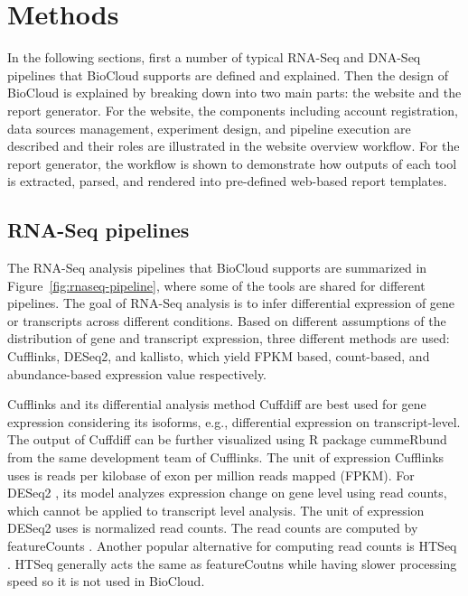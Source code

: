 \chapter{Methods}
\label{c:method}

In the following sections, first a number of typical RNA-Seq and DNA-Seq
pipelines that BioCloud supports are defined and explained. Then the design of
BioCloud is explained by breaking down into two main parts: the website and the
report generator. For the website, the components including account
registration, data sources management, experiment design, and pipeline
execution are described and their roles are illustrated in the website overview
workflow. For the report generator, the workflow is shown to demonstrate how
outputs of each tool is extracted, parsed, and rendered into pre-defined
web-based report templates.



\section{RNA-Seq pipelines}
\label{s:rnaseq-pipeline}

The RNA-Seq analysis pipelines that BioCloud supports are summarized in
Figure~\ref{fig:rnaseq-pipeline}, where some of the tools are shared for
different pipelines. The goal of RNA-Seq analysis is to infer differential
expression of gene or transcripts across different conditions. Based on
different assumptions of the distribution of gene and transcript expression,
three different methods are used: Cufflinks, DESeq2, and kallisto, which yield
FPKM based, count-based, and abundance-based expression value respectively.



Cufflinks \cite{trapnell2010:transcript} and its differential analysis method
Cuffdiff \cite{trapnell2013:differential} are best used for gene expression
considering its isoforms, e.g., differential expression on transcript-level.
The output of Cuffdiff can be further visualized using R package cummeRbund
\cite{:cummerbund} from the same development team of Cufflinks. The unit of
expression Cufflinks uses is reads per kilobase of exon per million reads
mapped (FPKM). For DESeq2 \cite{love2014:moderated}, its model analyzes
expression change on gene level using read counts, which cannot be applied to
transcript level analysis. The unit of expression DESeq2 uses is normalized
read counts. The read counts are computed by featureCounts
\cite{liao2014:featurecounts}. Another popular alternative for computing read
counts is HTSeq \cite{anders2015:htseqa}. HTSeq generally acts the same as
featureCoutns while having slower processing speed so it is not used in
BioCloud.


